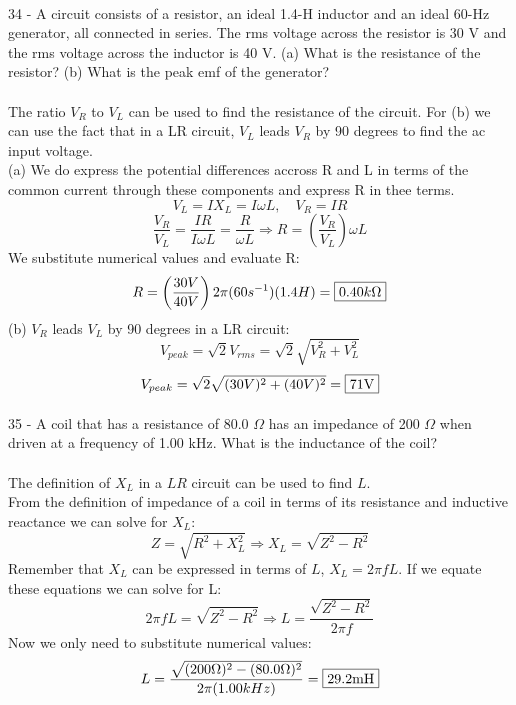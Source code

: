 \documentclass{report}
\begin{document}
\paragraph{}
34 - A circuit consists of a resistor, an ideal 1.4-H inductor and an ideal 60-Hz generator, all connected in series. The rms voltage across the resistor is 30 V and the rms voltage across the inductor is 40 V. (a) What is the resistance of the resistor? (b) What is the peak emf of the generator?\\
\\
The ratio $V_R$ to $V_L$ can be used to find the resistance of the circuit. For (b) we can use the fact that in a LR circuit, $V_L$ leads $V_R$ by 90 degrees to find the ac input voltage.\\
(a) We do express the potential differences accross R and L in terms of the common current through these components and express R in thee terms.
$$V_L = IX_L = I\omega L, \quad V_R = IR$$
$$\frac{V_R}{V_L} = \frac{IR}{I\omega L} = \frac{R}{\omega L} \Rightarrow R = \left( \frac{V_R}{V_L} \right)\omega L$$
We substitute numerical values and evaluate R:
$$R = \left( \frac{30V}{40V} \right) 2\pi (60s^{-1})(1.4H) = \fbox{$0.40k\Omega$}$$
(b) $V_R$ leads $V_L$ by 90 degrees in a LR circuit:
$$V_{peak} = \sqrt{2}V_{rms} = \sqrt{2}\sqrt{V_R^2 + V_L^2}$$
$$V_{peak} = \sqrt{2} \sqrt{(30V)^2 + (40V)^2} = \fbox{71V}$$

\paragraph{}
35 - A coil that has a resistance of 80.0 $\Omega$ has an impedance of 200 $\Omega$ when driven at a frequency of 1.00 kHz. What is the inductance of the coil?\\
\\
The definition of $X_L$ in a $LR$ circuit can be used to find $L$.\\
From the definition of impedance of a coil in terms of its resistance and inductive reactance we can solve for $X_L$:
$$Z = \sqrt{R^2 + X_L^2} \Rightarrow X_L = \sqrt{Z^2 - R^2}$$
Remember that $X_L$ can be expressed in terms of $L$, $X_L = 2\pi fL$. If we equate these equations we can solve for L:
$$2\pi fL = \sqrt{Z^2 - R^2} \Rightarrow L = \frac{\sqrt{Z^2 - R^2}}{2\pi f}$$
Now we only need to substitute numerical values:
$$L = \frac{\sqrt{(200\Omega)^2-(80.0\Omega)^2}}{2\pi (1.00kHz)} = \fbox{29.2mH}$$
\end{document}
